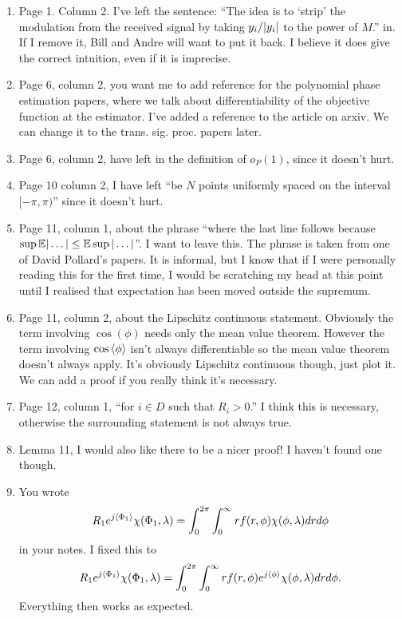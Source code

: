 \documentclass[a4paper,12pt]{article}
\begin{document}
\begin{enumerate}
\item Page 1. Column 2. I've left the sentence: ``The idea is to `strip' the modulation from the received signal by taking $y_i / {\left\vert y_i \right\vert}$ to the power of $M$.'' in.  If I remove it, Bill and Andre will want to put it back.  I believe it does give the correct intuition, even if it is imprecise.
\item Page 6, column 2, you want me to add reference for the polynomial phase estimation papers, where we talk about differentiability of the objective function at the estimator.  I've added a reference to the article on arxiv.  We can change it to the trans. sig. proc. papers later.
\item Page 6, column 2, have left in the definition of $o_P(1)$, since it doesn't hurt.
\item Page 10 column 2, I have left ``be $N$ points uniformly spaced on the interval $[-\pi, \pi)$'' since it doesn't hurt.
\item Page 11, column 1, about the phrase ``where the last line follows because $\sup {\mathbb E}\vert \dots\vert \leq {\mathbb E} \sup \vert \dots \vert$''.  I want to leave this.  The phrase is taken from one of David Pollard's papers.  It is informal, but I know that if I were personally reading this for the first time, I would be scratching my head at this point until I realised that expectation has been moved outside the supremum.
\item Page 11, column 2, about the Lipschitz continuous statement.  Obviously the term involving $\cos(\phi)$ needs only the mean value theorem.  However the term involving $\cos\left\langle \phi \right\rangle$ isn't always differentiable so the mean value theorem doesn't always apply.  It's obviously Lipschitz continuous though, just plot it.  We can add a proof if you really think it's necessary.
\item Page 12, column 1, ``for $i \in D$ such that $R_i > 0$.'' I think this is necessary, otherwise the surrounding statement is not always true.
\item Lemma 11, I would also like there to be a nicer proof!  I haven't found one though.
\item You wrote
\[
R_1 e^{j\left\langle \Phi_1 \right\rangle} \chi(\Phi_1,\lambda) = \int_{0}^{2\pi}\int_{0}^{\infty} r f(r,\phi) \chi(\phi,\lambda) dr d\phi
\]
in your notes.  I fixed this to
\[
R_1 e^{j\left\langle \Phi_1 \right\rangle} \chi(\Phi_1,\lambda) = \int_{0}^{2\pi}\int_{0}^{\infty} r f(r,\phi) e^{j\left\langle \phi \right\rangle} \chi(\phi,\lambda) dr d\phi.
\]
Everything then works as expected.
\end{enumerate}
\end{document}
